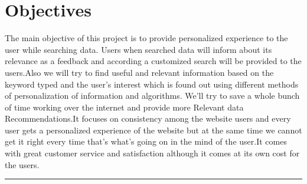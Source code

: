 \section{Objectives}
The main objective of this project is to provide personalized
experience to the user while searching data. Users when
searched data will inform about its relevance as a feedback
and according a customized search will be provided to the
users.Also we will try to find useful and relevant information
based on the keyword typed and the user’s interest which is
found out using different methods of personalization of
information and algorithms. We’ll try to save a whole bunch
of time working over the internet and provide more Relevant
data Recommendations.It focuses on consistency among the website users and every user gets a
personalized experience of the website but at the same time
we cannot get it right every time that's what's going on in the
mind of the user.It comes with great
customer service and satisfaction although it comes at its own
cost for the users.
\vspace{10mm}
\hrule